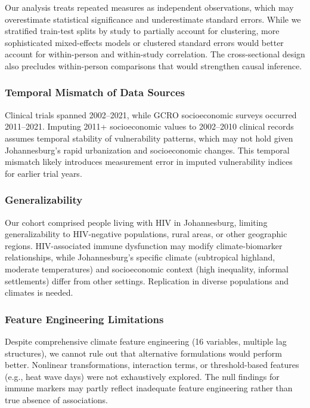 Our analysis treats repeated measures as independent observations, which may overestimate statistical significance and underestimate standard errors. While we stratified train-test splits by study to partially account for clustering, more sophisticated mixed-effects models or clustered standard errors would better account for within-person and within-study correlation. The cross-sectional design also precludes within-person comparisons that would strengthen causal inference.

\subsubsection{Temporal Mismatch of Data Sources}

Clinical trials spanned 2002--2021, while GCRO socioeconomic surveys occurred 2011--2021. Imputing 2011+ socioeconomic values to 2002--2010 clinical records assumes temporal stability of vulnerability patterns, which may not hold given Johannesburg's rapid urbanization and socioeconomic changes. This temporal mismatch likely introduces measurement error in imputed vulnerability indices for earlier trial years.

\subsubsection{Generalizability}

Our cohort comprised people living with HIV in Johannesburg, limiting generalizability to HIV-negative populations, rural areas, or other geographic regions. HIV-associated immune dysfunction may modify climate-biomarker relationships, while Johannesburg's specific climate (subtropical highland, moderate temperatures) and socioeconomic context (high inequality, informal settlements) differ from other settings. Replication in diverse populations and climates is needed.

\subsubsection{Feature Engineering Limitations}

Despite comprehensive climate feature engineering (16 variables, multiple lag structures), we cannot rule out that alternative formulations would perform better. Nonlinear transformations, interaction terms, or threshold-based features (e.g., heat wave days) were not exhaustively explored. The null findings for immune markers may partly reflect inadequate feature engineering rather than true absence of associations.


